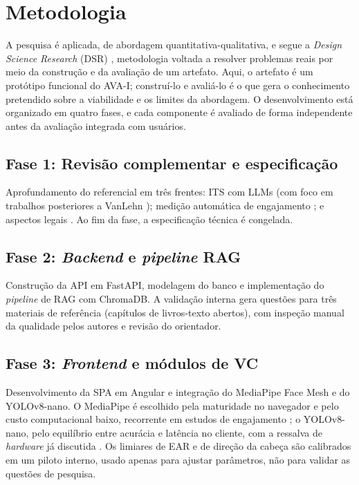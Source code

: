 \documentclass[portuguese,oneside]{tcc}
\begin{document}
\chapter{\label{sec:met}Metodologia}

A pesquisa é aplicada, de abordagem quantitativa-qualitativa, e segue a \emph{Design Science Research} (DSR) \cite{HMPR04}, metodologia voltada a resolver problemas reais por meio da construção e da avaliação de um artefato. Aqui, o artefato é um protótipo funcional do AVA-I; construí-lo e avaliá-lo é o que gera o conhecimento pretendido sobre a viabilidade e os limites da abordagem. O desenvolvimento está organizado em quatro fases, e cada componente é avaliado de forma independente antes da avaliação integrada com usuários.

\section{Fase 1: Revisão complementar e especificação}
Aprofundamento do referencial em três frentes: ITS com LLMs (com foco em trabalhos posteriores a VanLehn \cite{Van11}); medição automática de engajamento \cite{DDD17,AK24,DD25}; e aspectos legais \cite{Bra18}. Ao fim da fase, a especificação técnica é congelada.

\section{Fase 2: \emph{Backend} e \emph{pipeline} RAG}
Construção da API em FastAPI, modelagem do banco e implementação do \emph{pipeline} de RAG com ChromaDB. A validação interna gera questões para três materiais de referência (capítulos de livros-texto abertos), com inspeção manual da qualidade pelos autores e revisão do orientador.

\section{Fase 3: \emph{Frontend} e módulos de VC}
Desenvolvimento da SPA em Angular e integração do MediaPipe Face Mesh e do YOLOv8-nano. O MediaPipe é escolhido pela maturidade no navegador e pelo custo computacional baixo, recorrente em estudos de engajamento \cite{LTN19,AK24,DD25}; o YOLOv8-nano, pelo equilíbrio entre acurácia e latência no cliente, com a ressalva de \emph{hardware} já discutida \cite{JCQ23}. Os limiares de EAR e de direção da cabeça são calibrados em um piloto interno, usado apenas para ajustar parâmetros, não para validar as questões de pesquisa.
\end{document}
